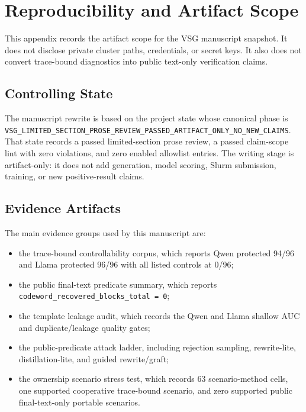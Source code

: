 \section{Reproducibility and Artifact Scope}
\label{app:reproducibility}

This appendix records the artifact scope for the VSG manuscript snapshot.  It
does not disclose private cluster paths, credentials, or secret keys.  It also
does not convert trace-bound diagnostics into public text-only verification
claims.

\subsection{Controlling State}

The manuscript rewrite is based on the project state whose canonical phase is
\texttt{VSG\_LIMITED\_SECTION\_PROSE\_REVIEW\_PASSED\_ARTIFACT\_ONLY\_NO\_NEW\_CLAIMS}.
That state records a passed limited-section prose review, a passed claim-scope
lint with zero violations, and zero enabled allowlist entries.  The writing
stage is artifact-only: it does not add generation, model scoring, Slurm
submission, training, or new positive-result claims.

\subsection{Evidence Artifacts}

The main evidence groups used by this manuscript are:
\begin{itemize}
\item the trace-bound controllability corpus, which reports Qwen protected
94/96 and Llama protected 96/96 with all listed controls at 0/96;
\item the public final-text predicate summary, which reports
\texttt{codeword\_recovered\_blocks\_total = 0};
\item the template leakage audit, which records the Qwen and Llama shallow AUC
and duplicate/leakage quality gates;
\item the public-predicate attack ladder, including rejection sampling,
rewrite-lite, distillation-lite, and guided rewrite/graft;
\item the ownership scenario stress test, which records 63 scenario-method
cells, one supported cooperative trace-bound scenario, and zero supported
public final-text-only portable scenarios.
\end{itemize}

